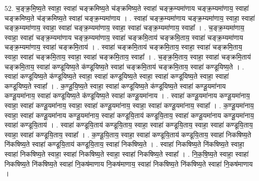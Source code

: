 \documentclass[17pt]{extarticle}
\begin{document}
52. च॒ङ्क्र॒मि॒ष्य॒ते स्वाहा॒ स्वाहा॑ चङ्क्रमिष्य॒ते च॑ङ्क्रमिष्य॒ते स्वाहा॑ चङ्क्र॒म्यमा॑णाय चङ्क्र॒म्यमा॑णाय॒ स्वाहा॑ चङ्क्रमिष्य॒ते च॑ङ्क्रमिष्य॒ते स्वाहा॑ चङ्क्र॒म्यमा॑णाय । . स्वाहा॑ चङ्क्र॒म्यमा॑णाय चङ्क्र॒म्यमा॑णाय॒ स्वाहा॒ स्वाहा॑ चङ्क्र॒म्यमा॑णाय॒ स्वाहा॒ स्वाहा॑ चङ्क्र॒म्यमा॑णाय॒ स्वाहा॒ स्वाहा॑ चङ्क्र॒म्यमा॑णाय॒ स्वाहा᳚ । . च॒ङ्क्र॒म्यमा॑णाय॒ स्वाहा॒ स्वाहा॑ चङ्क्र॒म्यमा॑णाय चङ्क्र॒म्यमा॑णाय॒ स्वाहा॑ चङ्क्रमि॒ताय॑ चङ्क्रमि॒ताय॒ स्वाहा॑ चङ्क्र॒म्यमा॑णाय चङ्क्र॒म्यमा॑णाय॒ स्वाहा॑ चङ्क्रमि॒ताय॑ । . स्वाहा॑ चङ्क्रमि॒ताय॑ चङ्क्रमि॒ताय॒ स्वाहा॒ स्वाहा॑ चङ्क्रमि॒ताय॒ स्वाहा॒ स्वाहा॑ चङ्क्रमि॒ताय॒ स्वाहा॒ स्वाहा॑ चङ्क्रमि॒ताय॒ स्वाहा᳚ । . च॒ङ्क्र॒मि॒ताय॒ स्वाहा॒ स्वाहा॑ चङ्क्रमि॒ताय॑ चङ्क्रमि॒ताय॒ स्वाहा॑ कण्डूयिष्य॒ते क॑ण्डूयिष्य॒ते स्वाहा॑ चङ्क्रमि॒ताय॑ चङ्क्रमि॒ताय॒ स्वाहा॑ कण्डूयिष्य॒ते । . स्वाहा॑ कण्डूयिष्य॒ते क॑ण्डूयिष्य॒ते स्वाहा॒ स्वाहा॑ कण्डूयिष्य॒ते स्वाहा॒ स्वाहा॑ कण्डूयिष्य॒ते स्वाहा॒ स्वाहा॑ कण्डूयिष्य॒ते स्वाहा᳚ । . क॒ण्डू॒यि॒ष्य॒ते स्वाहा॒ स्वाहा॑ कण्डूयिष्य॒ते क॑ण्डूयिष्य॒ते स्वाहा॑ कण्डू॒यमा॑नाय कण्डू॒यमा॑नाय॒ स्वाहा॑ कण्डूयिष्य॒ते क॑ण्डूयिष्य॒ते स्वाहा॑ कण्डू॒यमा॑नाय । . स्वाहा॑ कण्डू॒यमा॑नाय कण्डू॒यमा॑नाय॒ स्वाहा॒ स्वाहा॑ कण्डू॒यमा॑नाय॒ स्वाहा॒ स्वाहा॑ कण्डू॒यमा॑नाय॒ स्वाहा॒ स्वाहा॑ कण्डू॒यमा॑नाय॒ स्वाहा᳚ । . क॒ण्डू॒यमा॑नाय॒ स्वाहा॒ स्वाहा॑ कण्डू॒यमा॑नाय कण्डू॒यमा॑नाय॒ स्वाहा॑ कण्डूयि॒ताय॑ कण्डूयि॒ताय॒ स्वाहा॑ कण्डू॒यमा॑नाय कण्डू॒यमा॑नाय॒ स्वाहा॑ कण्डूयि॒ताय॑ । . स्वाहा॑ कण्डूयि॒ताय॑ कण्डूयि॒ताय॒ स्वाहा॒ स्वाहा॑ कण्डूयि॒ताय॒ स्वाहा॒ स्वाहा॑ कण्डूयि॒ताय॒ स्वाहा॒ स्वाहा॑ कण्डूयि॒ताय॒ स्वाहा᳚ । . क॒ण्डू॒यि॒ताय॒ स्वाहा॒ स्वाहा॑ कण्डूयि॒ताय॑ कण्डूयि॒ताय॒ स्वाहा॑ निकषिष्य॒ते नि॑कषिष्य॒ते स्वाहा॑ कण्डूयि॒ताय॑ कण्डूयि॒ताय॒ स्वाहा॑ निकषिष्य॒ते । . स्वाहा॑ निकषिष्य॒ते नि॑कषिष्य॒ते स्वाहा॒ स्वाहा॑ निकषिष्य॒ते स्वाहा॒ स्वाहा॑ निकषिष्य॒ते स्वाहा॒ स्वाहा॑ निकषिष्य॒ते स्वाहा᳚ । . नि॒क॒षि॒ष्य॒ते स्वाहा॒ स्वाहा॑ निकषिष्य॒ते नि॑कषिष्य॒ते स्वाहा॑ नि॒कष॑माणाय नि॒कष॑माणाय॒ स्वाहा॑ निकषिष्य॒ते नि॑कषिष्य॒ते स्वाहा॑ नि॒कष॑माणाय । \newline
\end{document}
